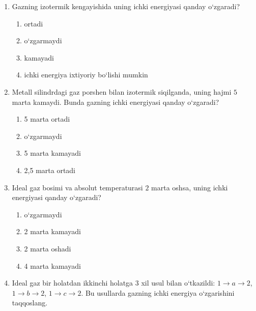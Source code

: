\begin{enumerate}
\item Gazning izotermik kengayishida uning ichki energiyasi qanday o‘zgaradi?
\begin{enumerate}[label=\Alph*)]
\item ortadi
\item o‘zgarmaydi
\item kamayadi
\item ichki energiya ixtiyoriy bo‘lishi mumkin

\end{enumerate}

\item Metall silindrdagi gaz porshen bilan izotermik siqilganda, uning hajmi $5$ marta kamaydi. Bunda gazning ichki energiyasi qanday o‘zgaradi?
\begin{enumerate}[label=\Alph*)]
\item 5 marta ortadi
\item o‘zgarmaydi
\item 5 marta kamayadi
\item 2,5 marta ortadi

\end{enumerate}

\item Ideal gaz bosimi va absolut temperaturasi $2$ marta oshsa, uning ichki energiyasi qanday o‘zgaradi?
\begin{enumerate}[label=\Alph*)]
\item o‘zgarmaydi
\item 2 marta kamayadi
\item 2 marta oshadi
\item 4 marta kamayadi

\end{enumerate}

\item Ideal gaz bir holatdan ikkinchi holatga 3 xil usul bilan o‘tkazildi: $1\to a\to 2$, $1\to b\to 2$, $1\to c\to 2$. Bu usullarda gazning ichki energiya o‘zgarishini taqqoslang.

\end{enumerate}
